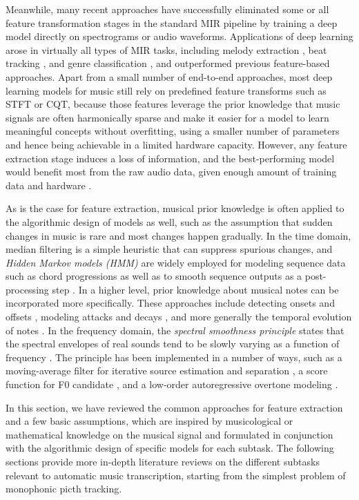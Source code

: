Meanwhile, many recent approaches have successfully eliminated some or all feature transformation stages in the standard MIR pipeline by training a deep model directly on spectrograms or audio waveforms.
Applications of deep learning arose in virtually all types of MIR tasks, including melody extraction \cite{bittner2017deepsalience}, beat tracking \cite{vogl2017drum}, and genre classification \cite{oramas2017genre}, and outperformed previous feature-based approaches.
Apart from a small number of end-to-end approaches, most deep learning models for music still rely on predefined feature transforms such as STFT or CQT, because those features leverage the prior knowledge that music signals are often harmonically sparse and make it easier for a model to learn meaningful concepts without overfitting, using a smaller number of parameters and hence being achievable in a limited hardware capacity.
However, any feature extraction stage induces a loss of information, and the best-performing model would benefit most from the raw audio data, given enough amount of training data and hardware \cite{pons2018tagging}.


As is the case for feature extraction, musical prior knowledge is often applied to the algorithmic design of models as well, such as the assumption that sudden changes in music is rare and most changes happen gradually.
In the time domain, median filtering \cite{oudre2009chord} is a simple heuristic that can suppress spurious changes, and \textit{Hidden Markov models (HMM)} are widely employed for modeling sequence data such as chord progressions \cite{cho2010chord} as well as to smooth sequence outputs as a post-processing step \cite{khadkevich2009hmm}.
In a higher level, prior knowledge about musical notes can be incorporated more specifically. These approaches include detecting onsets and offsets \cite{benetos2011polyphonic}, modeling attacks and decays \cite{cheng2016attackdecay}, and more generally the temporal evolution of notes \cite{cogliati2015temporal}.
In the frequency domain, the \textit{spectral smoothness principle} states that the spectral envelopes of real sounds tend to be slowly varying as a function of frequency \cite{klapuri2003multiple}.
The principle has been implemented in a number of ways, such as a moving-average filter for iterative source estimation and separation \cite{klapuri2003multiple}, a score function for F0 candidate \cite{yeh2010mffe}, and a low-order autoregressive overtone modeling \cite{emiya2010smoothness}.

In this section, we have reviewed the common approaches for feature extraction and a few basic assumptions, which are inspired by musicological or mathematical knowledge on the musical signal and formulated in conjunction with the algorithmic design of specific models for each subtask.
The following sections provide more in-depth literature reviews on the different subtasks relevant to automatic music transcription, starting from the simplest problem of monophonic picth tracking.


